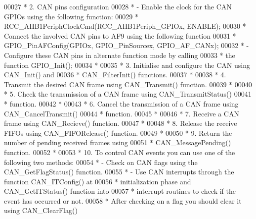 \begin{DoxyCode}
00027 \textcolor{comment}{  *          2. CAN pins configuration}
00028 \textcolor{comment}{  *               - Enable the clock for the CAN GPIOs using the following function:}
00029 \textcolor{comment}{  *                   RCC\_AHB1PeriphClockCmd(RCC\_AHB1Periph\_GPIOx, ENABLE);   }
00030 \textcolor{comment}{  *               - Connect the involved CAN pins to AF9 using the following function }
00031 \textcolor{comment}{  *                   GPIO\_PinAFConfig(GPIOx, GPIO\_PinSourcex, GPIO\_AF\_CANx); }
00032 \textcolor{comment}{  *                - Configure these CAN pins in alternate function mode by calling}
00033 \textcolor{comment}{  *                  the function  GPIO\_Init();}
00034 \textcolor{comment}{  *    }
00035 \textcolor{comment}{  *          3.  Initialise and configure the CAN using CAN\_Init() and }
00036 \textcolor{comment}{  *               CAN\_FilterInit() functions.   }
00037 \textcolor{comment}{  *               }
00038 \textcolor{comment}{  *          4.  Transmit the desired CAN frame using CAN\_Transmit() function.}
00039 \textcolor{comment}{  *         }
00040 \textcolor{comment}{  *          5.  Check the transmission of a CAN frame using CAN\_TransmitStatus()}
00041 \textcolor{comment}{  *              function.}
00042 \textcolor{comment}{  *               }
00043 \textcolor{comment}{  *          6.  Cancel the transmission of a CAN frame using CAN\_CancelTransmit()}
00044 \textcolor{comment}{  *              function.  }
00045 \textcolor{comment}{  *            }
00046 \textcolor{comment}{  *          7.  Receive a CAN frame using CAN\_Recieve() function.}
00047 \textcolor{comment}{  *         }
00048 \textcolor{comment}{  *          8.  Release the receive FIFOs using CAN\_FIFORelease() function.}
00049 \textcolor{comment}{  *               }
00050 \textcolor{comment}{  *          9. Return the number of pending received frames using }
00051 \textcolor{comment}{  *              CAN\_MessagePending() function.            }
00052 \textcolor{comment}{  *                   }
00053 \textcolor{comment}{  *          10. To control CAN events you can use one of the following two methods:}
00054 \textcolor{comment}{  *               - Check on CAN flags using the CAN\_GetFlagStatus() function.  }
00055 \textcolor{comment}{  *               - Use CAN interrupts through the function CAN\_ITConfig() at }
00056 \textcolor{comment}{  *                 initialization phase and CAN\_GetITStatus() function into }
00057 \textcolor{comment}{  *                 interrupt routines to check if the event has occurred or not.}
00058 \textcolor{comment}{  *             After checking on a flag you should clear it using CAN\_ClearFlag()}

\end{DoxyCode}
